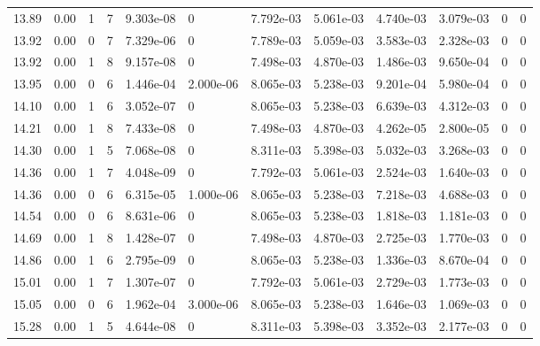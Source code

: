 \documentclass[preview]{standalone}
\begin{document}
{{{{{\begin{tabular}{L{1.2cm}C{1.2cm} C{0.3cm}C{0.5cm} C{1.4cm}C{1.4cm} C{1.4cm}C{1.4cm} C{1.6cm}C{1.6cm} C{1.6cm}C{1.6cm}}
  13.89  &  0.00  & 1     &  7 &  9.303e-08  & 0  &  7.792e-03&   5.061e-03& 4.740e-03 & 3.079e-03   &  0 & 0  \\ 
  13.92  &  0.00  & 0     &  7 &  7.329e-06  & 0  &  7.789e-03&   5.059e-03& 3.583e-03 & 2.328e-03   &  0 & 0  \\ 
  13.92  &  0.00  & 1     &  8 &  9.157e-08  & 0  &  7.498e-03&   4.870e-03& 1.486e-03 & 9.650e-04   &  0 & 0  \\ 
  13.95  &  0.00  & 0     &  6 &  1.446e-04  & 2.000e-06  &  8.065e-03&   5.238e-03& 9.201e-04 & 5.980e-04   &  0 & 0  \\ 
  14.10  &  0.00  & 1     &  6 &  3.052e-07  & 0  &  8.065e-03&   5.238e-03& 6.639e-03 & 4.312e-03   &  0 & 0  \\ 
  14.21  &  0.00  & 1     &  8 &  7.433e-08  & 0  &  7.498e-03&   4.870e-03& 4.262e-05 & 2.800e-05   &  0 & 0  \\ 
  14.30  &  0.00  & 1     &  5 &  7.068e-08  & 0  &  8.311e-03&   5.398e-03& 5.032e-03 & 3.268e-03   &  0 & 0  \\ 
  14.36  &  0.00  & 1     &  7 &  4.048e-09  & 0  &  7.792e-03&   5.061e-03& 2.524e-03 & 1.640e-03   &  0 & 0  \\ 
  14.36  &  0.00  & 0     &  6 &  6.315e-05  & 1.000e-06  &  8.065e-03&   5.238e-03& 7.218e-03 & 4.688e-03   &  0 & 0  \\ 
  14.54  &  0.00  & 0     &  6 &  8.631e-06  & 0  &  8.065e-03&   5.238e-03& 1.818e-03 & 1.181e-03   &  0 & 0  \\ 
  14.69  &  0.00  & 1     &  8 &  1.428e-07  & 0  &  7.498e-03&   4.870e-03& 2.725e-03 & 1.770e-03   &  0 & 0  \\ 
  14.86  &  0.00  & 1     &  6 &  2.795e-09  & 0  &  8.065e-03&   5.238e-03& 1.336e-03 & 8.670e-04   &  0 & 0  \\ 
  15.01  &  0.00  & 1     &  7 &  1.307e-07  & 0  &  7.792e-03&   5.061e-03& 2.729e-03 & 1.773e-03   &  0 & 0  \\ 
  15.05  &  0.00  & 0     &  6 &  1.962e-04  & 3.000e-06  &  8.065e-03&   5.238e-03& 1.646e-03 & 1.069e-03   &  0 & 0  \\ 
  15.28  &  0.00  & 1     &  5 &  4.644e-08  & 0  &  8.311e-03&   5.398e-03& 3.352e-03 & 2.177e-03   &  0 & 0  \\ 
\hline 
\end{tabular} 

}}}}}
\end{document}
